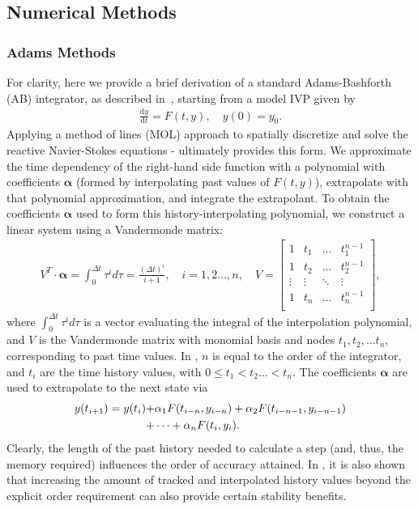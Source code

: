 \subsection{Numerical Methods}

\subsubsection{Adams Methods}

For clarity, here we provide a brief derivation of a standard Adams-Bashforth (AB)
integrator, as described in~\cite{bashforth1883attempt}, starting from a model IVP
given by
\begin{align}
\frac{\text{d}y}{\text{d}t} = F(t,y), \quad y(0) = y_{0}. \label{eq:ivp}
\end{align}
Applying a method of lines (MOL) approach to spatially discretize and solve
the reactive Navier-Stokes equations  -  ultimately
provides this form. We approximate the time dependency of the right-hand side function
with a polynomial with coefficients $\boldsymbol{\alpha}$ (formed by interpolating past
values of $F(t,y)$), extrapolate with that polynomial approximation, and integrate
the extrapolant. To obtain the coefficients $\boldsymbol{\alpha}$ used to form this
history-interpolating polynomial, we construct a linear system using a Vandermonde matrix:
\begin{align}
V^{T} \cdot \boldsymbol{\alpha} = \int_0^{\Delta t} \tau^{i} d\tau = \frac{(\Delta t)^{i}}{i+1}, \quad i = 1,2...,n, \quad V = \begin{bmatrix}
    1 & t_{1} &  \hdots   & t_{1}^{n-1}  \\
    1 & t_{2} & \hdots &  t_{2}^{n-1} \\
      \vdots  & \vdots  &  \ddots   &  \vdots   \\
       1 &   t_{n}  &  \hdots  & t_{n}^{n-1} \\
        \end{bmatrix}, \label{eq:vandermonde}
\end{align}
where $\int_0^{\Delta t} \tau^{i} d\tau$ is a vector evaluating the integral of
the interpolation polynomial, and $V$ is the Vandermonde matrix with monomial
basis and nodes $t_{1}, t_{2}, \hdots t_{n}$, corresponding to past time
values. In , $n$ is equal to the order of the integrator,
and $t_{i}$ are the time history values, with $0 \leq t_{1} < t_{2} \hdots <
t_{n}$.  The coefficients $\boldsymbol{\alpha}$ are used to extrapolate to the
next state via
\begin{align}
y(t_{i+1}) = y(t_{i}) +& \alpha_{1}F(t_{i-n},y_{i-n}) + \alpha_{2}F(t_{i-n-1},y_{i-n-1}) \notag \\
+& \cdots + \alpha_{n}F(t_{i},y_{i}). \label{eq:ab_general}
\end{align}
Clearly, the length of the past history needed to calculate a step (and, thus,
the memory required) influences the order of accuracy attained. In \cite{mikida2019multi},
it is also shown that increasing the amount of tracked and interpolated history
values beyond the explicit order requirement can also provide certain stability
benefits.

